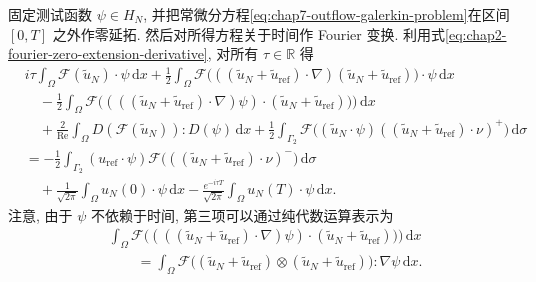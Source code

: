 \begin{sloppypar}
\begin{Proof}
固定测试函数 $\psi\in H_N$, 并把常微分方程\eqref{eq:chap7-outflow-galerkin-problem}在区间 $[0,T]$ 之外作零延拓. 然后对所得方程关于时间作 Fourier 变换. 利用式\eqref{eq:chap2-fourier-zero-extension-derivative}, 对所有 $\tau\in\mathbb R$ 得
\begin{equation}
\begin{aligned}
 &i\tau\int_\Omega\mathcal F(\widetilde u_N)\cdot\psi\,\mathrm dx
 +\frac12\int_\Omega\mathcal F\bigl(((\widetilde u_N+\widetilde u_{\mathrm{ref}})\cdot\nabla)
 (\widetilde u_N+\widetilde u_{\mathrm{ref}})\bigr)\cdot\psi\,\mathrm dx\\
 &\quad-\frac12\int_\Omega\mathcal F\bigl((((\widetilde u_N+\widetilde u_{\mathrm{ref}})\cdot\nabla)\psi)
 \cdot(\widetilde u_N+\widetilde u_{\mathrm{ref}}))\bigr)\,\mathrm dx\\
 &\quad+\frac2{\operatorname{Re}}\int_\Omega D(\mathcal F(\widetilde u_N)):D(\psi)\,\mathrm dx
 +\frac12\int_{\Gamma_2}\mathcal F\bigl((\widetilde u_N\cdot\psi)
 ((\widetilde u_N+\widetilde u_{\mathrm{ref}})\cdot\nu)^+\bigr)\,\mathrm d\sigma\\
 &=-\frac12\int_{\Gamma_2}(u_{\mathrm{ref}}\cdot\psi)
 \mathcal F\bigl(((\widetilde u_N+\widetilde u_{\mathrm{ref}})\cdot\nu)^-\bigr)\,\mathrm d\sigma\\
 &\quad+\frac1{\sqrt{2\pi}}\int_\Omega u_N(0)\cdot\psi\,\mathrm dx
 -\frac{e^{-i\tau T}}{\sqrt{2\pi}}\int_\Omega u_N(T)\cdot\psi\,\mathrm dx.
\end{aligned}
\label{eq:chap7-fourier-galerkin}
\end{equation}
注意, 由于 $\psi$ 不依赖于时间, 第三项可以通过纯代数运算表示为
\[
\begin{aligned}
 &\int_\Omega\mathcal F\bigl((((\widetilde u_N+\widetilde u_{\mathrm{ref}})\cdot\nabla)\psi)
 \cdot(\widetilde u_N+\widetilde u_{\mathrm{ref}}))\bigr)\,\mathrm dx\\
 &\qquad=\int_\Omega\mathcal F\bigl((\widetilde u_N+\widetilde u_{\mathrm{ref}})
 \otimes(\widetilde u_N+\widetilde u_{\mathrm{ref}})\bigr):\nabla\psi\,\mathrm dx.
\end{aligned}
\]


\end{Proof}
\end{sloppypar}
